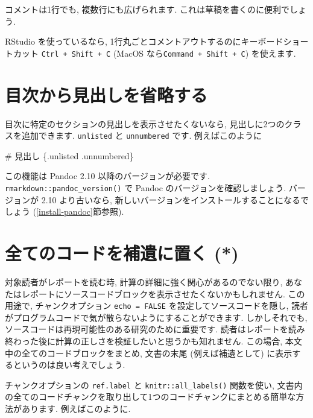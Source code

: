 \documentclass[
  11pt,
  lualatex,ja=standard,jafont=noto]{bxjsreport}
\newenvironment{Shaded}{\begin{snugshade}}{\end{snugshade}}
\newcommand{\FunctionTok}[1]{\textcolor[rgb]{0.00,0.00,0.00}{#1}}
\begin{document}
コメントは1行でも, 複数行にも広げられます. これは草稿を書くのに便利でしょう.

RStudio を使っているなら, 1行丸ごとコメントアウトするのにキーボードショートカット \texttt{Ctrl + Shift + C} (MacOS なら\texttt{Command + Shift + C}) を使えます.

\hypertarget{toc-unlisted}{%
\section{目次から見出しを省略する}\label{toc-unlisted}}

目次に特定のセクションの見出しを表示させたくないなら, 見出しに2つのクラスを追加できます. \texttt{unlisted} と \texttt{unnumbered} です. 例えばこのように

\begin{Shaded}
\begin{Highlighting}[]
\FunctionTok{\# 見出し \{.unlisted .unnumbered\}}
\end{Highlighting}
\end{Shaded}

この機能は Pandoc 2.10 以降のバージョンが必要です. \texttt{rmarkdown::pandoc\_version()} で Pandoc のバージョンを確認しましょう. バージョンが 2.10 より古いなら, 新しいバージョンをインストールすることになるでしょう (\ref{install-pandoc}節参照).

\hypertarget{code-appendix}{%
\section{全てのコードを補遺に置く (*)}\label{code-appendix}}

対象読者がレポートを読む時, 計算の詳細に強く関心があるのでない限り, あなたはレポートにソースコードブロックを表示させたくないかもしれません. この用途で, チャンクオプション \texttt{echo = FALSE} を設定してソースコードを隠し, 読者がプログラムコードで気が散らないようにすることができます. しかしそれでも, ソースコードは再現可能性のある研究のために重要です. 読者はレポートを読み終わった後に計算の正しさを検証したいと思うかも知れません. この場合, 本文中の全てのコードブロックをまとめ, 文書の末尾 (例えば補遺として) に表示するというのは良い考えでしょう.

チャンクオプションの \texttt{ref.label} と \texttt{knitr::all\_labels()} 関数を使い, 文書内の全てのコードチャンクを取り出して1つのコードチャンクにまとめる簡単な方法があります. 例えばこのように.
\end{document}
